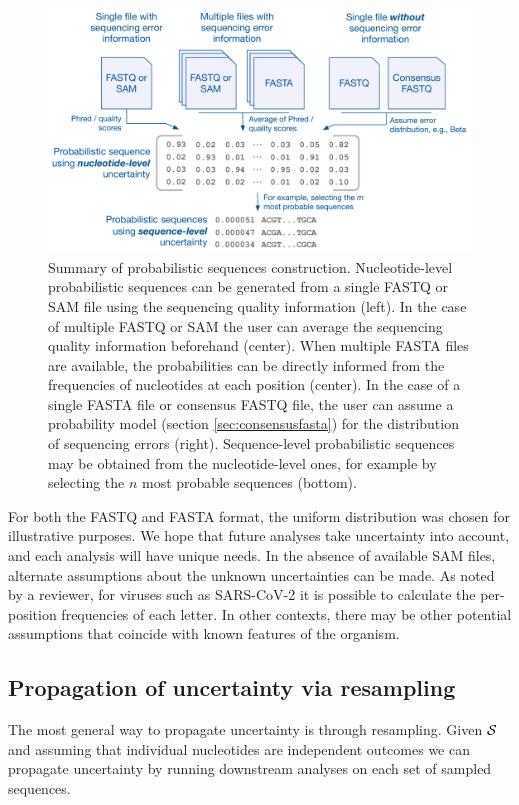 \documentclass[12pt]{article}
\begin{document}
\begin{figure}
\centering
\includegraphics[width=0.9\linewidth]{figs/fig-probseq.pdf}
\caption{Summary of probabilistic sequences construction. Nucleotide-level probabilistic sequences can be generated from a single FASTQ or SAM file using the sequencing quality information (left). In the case of multiple FASTQ or SAM the user can average the sequencing quality information beforehand (center). When multiple FASTA files are available, the probabilities can be directly informed from the frequencies of nucleotides at each position (center). In the case of a single FASTA file or consensus FASTQ file, the user can assume a probability model (section \ref{sec:consensusfasta}) for the distribution of sequencing errors (right). 
Sequence-level probabilistic sequences may be obtained from the nucleotide-level ones, for example by selecting the $n$ most probable sequences (bottom).}
\label{fig:probseq}
\end{figure}

For both the FASTQ and FASTA format, the uniform distribution was chosen for illustrative purposes.
We hope that future analyses take uncertainty into account, and each analysis will have unique needs.
In the absence of available SAM files, alternate assumptions about the unknown uncertainties can be made.
As noted by a reviewer, for viruses such as SARS-CoV-2 it is possible to calculate the per-position frequencies of each letter.
In other contexts, there may be other potential assumptions that coincide with known features of the organism.


\subsection{Propagation of uncertainty via resampling}

The most general way to propagate uncertainty is through resampling.
Given $\mathcal{S}$ and assuming that individual nucleotides are independent outcomes we can propagate uncertainty by running downstream analyses on each set of sampled sequences.
\end{document}
